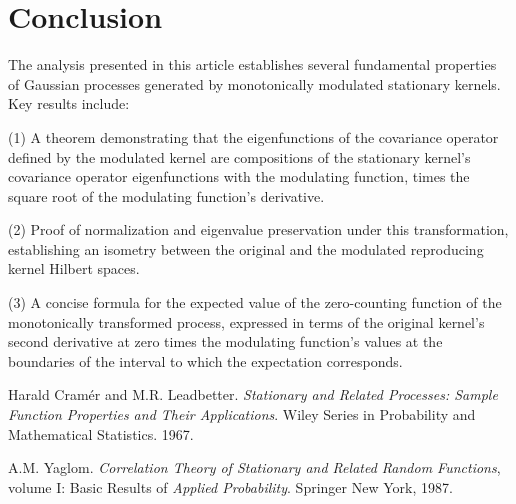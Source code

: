\documentclass{article}
\begin{document}
\section{Conclusion}

The analysis presented in this article establishes several fundamental properties of Gaussian processes generated by monotonically modulated stationary kernels. Key results include: 

(1) A theorem demonstrating that the eigenfunctions of the covariance operator defined by the modulated kernel are compositions of the stationary kernel's covariance operator eigenfunctions with the modulating function, times the square root of the modulating function's derivative.

(2) Proof of normalization and eigenvalue preservation under this transformation, establishing an isometry between the original and the modulated reproducing kernel Hilbert spaces.

(3) A concise formula for the expected value of the zero-counting function of the monotonically transformed process, expressed in terms of the original kernel's second derivative at zero times the modulating function's values at the boundaries of the interval to which the expectation corresponds.

\begin{thebibliography}{99}

Harald Cramér and M.R. Leadbetter. \textit{Stationary and Related Processes: Sample Function Properties and Their Applications}. Wiley Series in Probability and Mathematical Statistics. 1967.

A.M. Yaglom. \textit{Correlation Theory of Stationary and Related Random Functions}, volume I: Basic Results of \textit{Applied Probability}. Springer New York, 1987.

\end{thebibliography}
\end{document}
